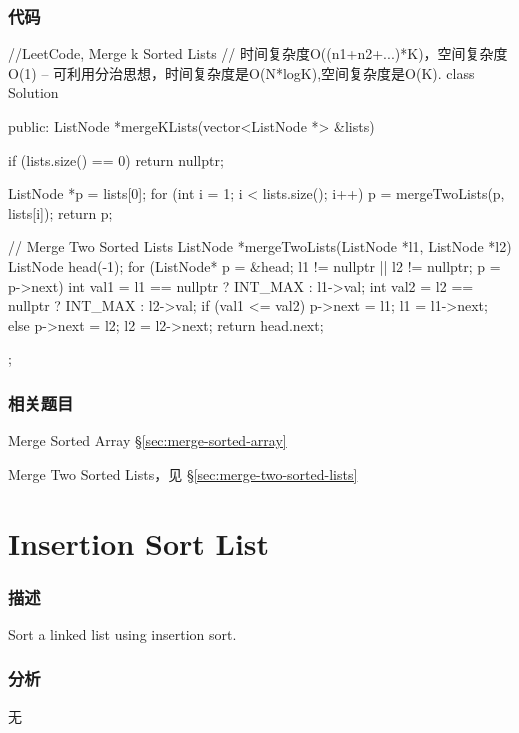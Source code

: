 \subsubsection{代码}
\begin{Code}
//LeetCode, Merge k Sorted Lists
// 时间复杂度O((n1+n2+...)*K)，空间复杂度O(1)  -- 可利用分治思想，时间复杂度是O(N*logK),空间复杂度是O(K).
class Solution {
public:
    ListNode *mergeKLists(vector<ListNode *> &lists) {
        if (lists.size() == 0) return nullptr;

        ListNode *p = lists[0];
        for (int i = 1; i < lists.size(); i++) {
            p = mergeTwoLists(p, lists[i]);
        }
        return p;
    }

    // Merge Two Sorted Lists
    ListNode *mergeTwoLists(ListNode *l1, ListNode *l2) {
        ListNode head(-1);
        for (ListNode* p = &head; l1 != nullptr || l2 != nullptr; p = p->next) {
            int val1 = l1 == nullptr ? INT_MAX : l1->val;
            int val2 = l2 == nullptr ? INT_MAX : l2->val;
            if (val1 <= val2) {
                p->next = l1;
                l1 = l1->next;
            } else {
                p->next = l2;
                l2 = l2->next;
            }
        }
        return head.next;
    }
};
\end{Code}


\subsubsection{相关题目}
\begindot
\item Merge Sorted Array \S \ref{sec:merge-sorted-array}
\item Merge Two Sorted Lists，见 \S \ref{sec:merge-two-sorted-lists}
\myenddot


\section{Insertion Sort List} %
\label{sec:Insertion-Sort-List}


\subsubsection{描述}
Sort a linked list using insertion sort.


\subsubsection{分析}
无


